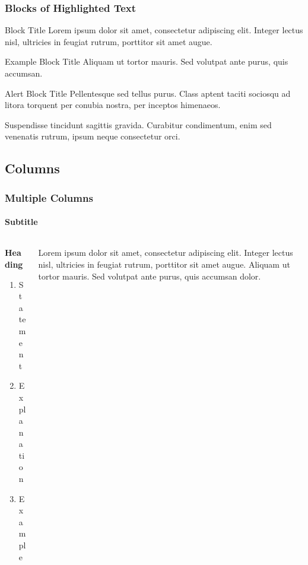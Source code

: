 \documentclass[
	11pt, %
	aspectratio=169, %
]{beamer}
\begin{document}
\begin{frame}
	\frametitle{Blocks of Highlighted Text}
	
	\begin{block}{Block Title}
		Lorem ipsum dolor sit amet, consectetur adipiscing elit. Integer lectus nisl, ultricies in feugiat rutrum, porttitor sit amet augue.
	\end{block}
	
	\begin{exampleblock}{Example Block Title}
		Aliquam ut tortor mauris. Sed volutpat ante purus, quis accumsan.
	\end{exampleblock}
	
	\begin{alertblock}{Alert Block Title}
		Pellentesque sed tellus purus. Class aptent taciti sociosqu ad litora torquent per conubia nostra, per inceptos himenaeos.
	\end{alertblock}
	
	\begin{block}{} %
		Suspendisse tincidunt sagittis gravida. Curabitur condimentum, enim sed venenatis rutrum, ipsum neque consectetur orci.
	\end{block}
\end{frame}


\subsection{Columns}

\begin{frame}
	\frametitle{Multiple Columns}
	\framesubtitle{Subtitle} %
	
	\begin{columns}[c] %
		\begin{column}{0.45\textwidth} %
			\textbf{Heading}
			\begin{enumerate}
				\item Statement
				\item Explanation
				\item Example
			\end{enumerate}
		\end{column}
		\begin{column}{0.5\textwidth} %
			Lorem ipsum dolor sit amet, consectetur adipiscing elit. Integer lectus nisl, ultricies in feugiat rutrum, porttitor sit amet augue. Aliquam ut tortor mauris. Sed volutpat ante purus, quis accumsan dolor.
		\end{column}
	\end{columns}
\end{frame}
\end{document}
